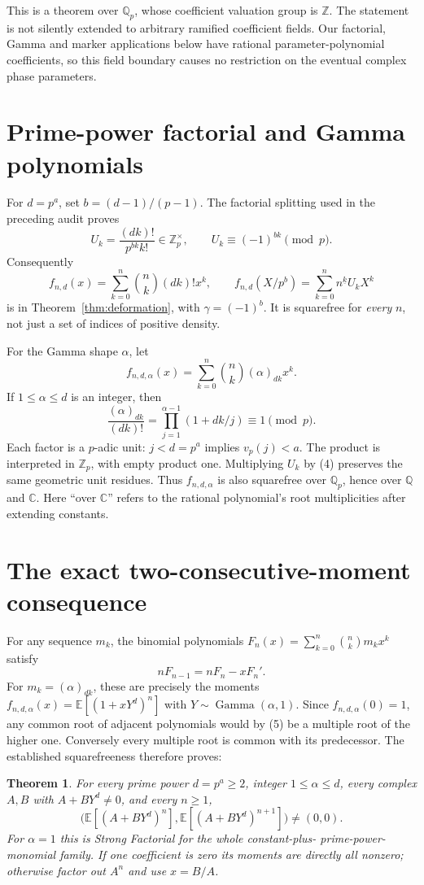 \documentclass[11pt]{article}
\newtheorem{theorem}{Theorem}
\newcommand{\Q}{\mathbb Q}
\newcommand{\C}{\mathbb C}
\newcommand{\Z}{\mathbb Z}
\newcommand{\vp}{v_p}
\begin{document}
This is a theorem over $\Q_p$, whose coefficient valuation group is
$\Z$. The statement is not silently extended to arbitrary ramified
coefficient fields. Our factorial, Gamma and marker applications below
have rational parameter-polynomial coefficients, so this field boundary
causes no restriction on the eventual complex phase parameters.

\section{Prime-power factorial and Gamma polynomials}
For $d=p^a$, set $b=(d-1)/(p-1)$. The factorial splitting used in the
preceding audit proves
\[
 U_k=\frac{(dk)!}{p^{bk}k!}\in\Z_p^\times,
 \qquad U_k\equiv(-1)^{bk}\pmod p.                 \tag{3}
\]
Consequently
\[
 f_{n,d}(x)=\sum_{k=0}^n\binom nk(dk)!x^k,
 \qquad f_{n,d}(X/p^b)=
       \sum_{k=0}^n n^{\underline k}U_kX^k
\]
is in Theorem~\ref{thm:deformation}, with $\gamma=(-1)^b$.
It is squarefree for \emph{every} $n$, not just a set of indices of
positive density.

For the Gamma shape $\alpha$, let
\[
 f_{n,d,\alpha}(x)=\sum_{k=0}^n\binom nk(\alpha)_{dk}x^k.
\]
If $1\le\alpha\le d$ is an integer, then
\[
 \frac{(\alpha)_{dk}}{(dk)!}
 =\prod_{j=1}^{\alpha-1}(1+dk/j)\equiv1\pmod p.      \tag{4}
\]
Each factor is a $p$-adic unit: $j<d=p^a$ implies $\vp(j)<a$.
The product is interpreted in $\Z_p$, with empty product one.
Multiplying $U_k$ by (4) preserves the same geometric unit residues.
Thus $f_{n,d,\alpha}$ is also squarefree over $\Q_p$, hence over $\Q$
and $\C$. Here ``over $\C$'' refers to the rational polynomial's root
multiplicities after extending constants.

\section{The exact two-consecutive-moment consequence}
For any sequence $m_k$, the binomial polynomials
$F_n(x)=\sum_{k=0}^n\binom nk m_kx^k$ satisfy
\[
 nF_{n-1}=nF_n-xF_n'.                              \tag{5}
\]
For $m_k=(\alpha)_{dk}$, these are precisely the moments
$f_{n,d,\alpha}(x)=\mathbb E[(1+xY^d)^n]$ with
$Y\sim\operatorname{Gamma}(\alpha,1)$.
Since $f_{n,d,\alpha}(0)=1$, any common root of adjacent polynomials
would by (5) be a multiple root of the higher one. Conversely every
multiple root is common with its predecessor. The established
squarefreeness therefore proves:

\begin{theorem}\label{thm:sfc}
For every prime power $d=p^a\ge2$, integer $1\le\alpha\le d$, every
complex $A,B$ with $A+BY^d\ne0$, and every $n\ge1$,
\[
 \bigl(\mathbb E[(A+BY^d)^n],
       \mathbb E[(A+BY^d)^{n+1}]\bigr)\ne(0,0).
\]
For $\alpha=1$ this is Strong Factorial for the whole constant-plus-
prime-power-monomial family. If one coefficient is zero its moments are
directly all nonzero; otherwise factor out $A^n$ and use $x=B/A$.
\end{theorem}
\end{document}
